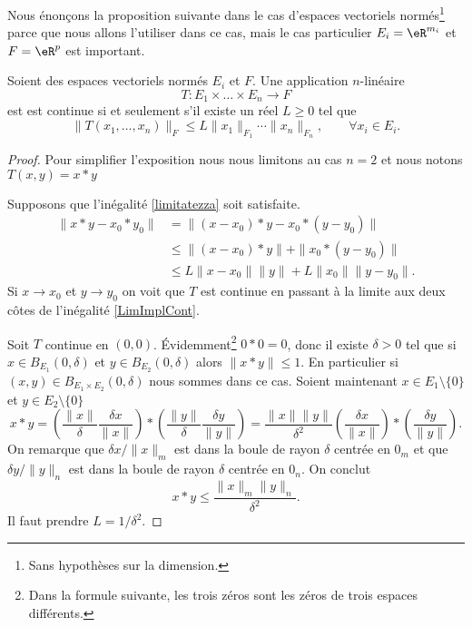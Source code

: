 Nous énonçons la proposition suivante dans le cas d'espaces vectoriels normés\footnote{Sans hypothèses sur la dimension.} parce que nous allons l'utiliser dans ce cas, mais le cas particulier \( E_i=\eR^{m_i}\) et \( F=\eR^p\) est important.
\begin{proposition} \label{PropUADlSMg}
    Soient des espaces vectoriels normés \( E_i\) et \( F\). Une application \( n\)-linéaire
    \begin{equation}
        T\colon E_1\times\ldots\times E_n\to F
    \end{equation}
    est est continue si et seulement s'il existe un réel $L\geq 0$ tel que
  \begin{equation}\label{limitatezza}
     \|T(x_1, \ldots,x_n)\|_F\leq L \|x_1\|_{F_1}\cdots\|x_n\|_{F_n}, \qquad \forall x_i\in E_i.
  \end{equation}
\end{proposition}

\begin{proof}
    Pour simplifier l'exposition nous nous limitons au cas $n=2$ et nous notons $T(x,y)=x*y$

    Supposons que l'inégalité \eqref{limitatezza} soit satisfaite. 
    \begin{equation}\label{LimImplCont}
      \begin{aligned}
        \|x*y-x_0*y_0\|&=\|(x-x_0)*y-x_0*(y-y_0)\|\\
    &\leq \|(x-x_0)*y\|+\|x_0*(y-y_0)\|\\
    &\leq L\|x-x_0\|\|y\| + L\|x_0\|\|y-y_0\|.
      \end{aligned}
    \end{equation}
    Si $x\to x_0$ et $y\to y_0$  on voit que $T$ est continue en passant à la limite aux deux côtes de l'inégalité \eqref{LimImplCont}.

    Soit $T$ continue en $(0,0)$. Évidemment\footnote{Dans la formule suivante, les trois zéros sont les zéros de trois espaces différents.} $0*0=0$, donc il existe $\delta>0$ tel que si $x\in B_{E_1}(0,\delta)$ et $y\in B_{E_2}(0,\delta)$ alors $\|x*y\|\leq 1$. En particulier si \( (x,y)\in B_{E_1\times E_2}(0,\delta)\) nous sommes dans ce cas. Soient maintenant  $x\in E_1\setminus\{ 0 \}$  et $y\in E_2\setminus\{ 0\}$
    \begin{equation}
        x*y=\left(\frac{\|x\|}{\delta}\frac{\delta x}{\|x\|}\right)*\left(\frac{\|y\|}{\delta}\frac{\delta y}{\|y\|}\right)
    =\frac{\|x\|\|y\|}{\delta^2} \left(\frac{\delta x}{\|x\|}\right)*\left(\frac{\delta y}{\|y\|}\right).
     \end{equation}
    On remarque que $\delta x/\|x\|_m$ est dans la boule de rayon $\delta$ centrée en $0_m$ et que $\delta y/\|y\|_n$ est dans la boule de rayon $\delta$ centrée en $0_n$. On conclut 
    \[
     x*y\leq \frac{\|x\|_m\|y\|_n}{\delta^2}.
    \]
    Il faut prendre $L=1/\delta^2$.
\end{proof}

